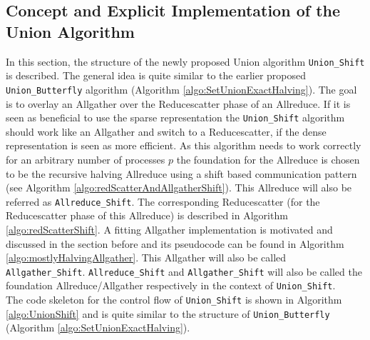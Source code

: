 \subsection{Concept and Explicit Implementation of the Union Algorithm}
In this section, the structure of the newly proposed Union algorithm \texttt{Union\_Shift} is described. The general idea is quite similar to the earlier proposed \texttt{Union\_Butterfly} algorithm (Algorithm \ref{algo:SetUnionExactHalving}). The goal is to overlay an Allgather over the Reducescatter phase of an Allreduce. If it is seen as beneficial to use the sparse representation the \texttt{Union\_Shift} algorithm should work like an Allgather and switch to a Reducescatter, if the dense representation is seen as more efficient. As this algorithm needs to work correctly for an arbitrary number of processes $p$ the foundation for the Allreduce is chosen to be the recursive halving Allreduce using a shift based communication pattern (see Algorithm \ref{algo:redScatterAndAllgatherShift}). This Allreduce will also be referred as \texttt{All\-re\-duce\-\_Shift}.  The corresponding Reducescatter (for the Reducescatter phase of this Allreduce) is described in Algorithm \ref{algo:redScatterShift}. A fitting Allgather implementation is motivated and discussed in the section before and its pseudocode can be found in Algorithm \ref{algo:mostlyHalvingAllgather}. This Allgather will also be called \texttt{All\-gath\-er\-\_\-Shift}. \texttt{All\-re\-duce\-\_Shift} and \texttt{All\-gath\-er\-\_\-Shift} will also be called the foundation Allreduce/Allgather respectively in the context of \texttt{Union\_Shift}.\\
The code skeleton for the control flow of \texttt{Union\_Shift} is shown in Algorithm \ref{algo:UnionShift} and is quite similar to the structure of \texttt{Union\_Butterfly} (Algorithm  \ref{algo:SetUnionExactHalving}). 
